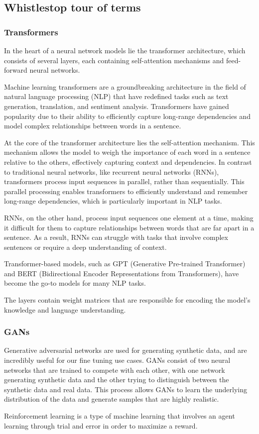 \subsection{Whistlestop tour of terms}
\subsubsection{Transformers}
In the heart of a neural network models lie the transformer architecture, which consists of several layers, each containing self-attention mechanisms and feed-forward neural networks. \par 
Machine learning transformers are a groundbreaking architecture in the field of natural language processing (NLP) that have redefined tasks such as text generation, translation, and sentiment analysis. Transformers have gained popularity due to their ability to efficiently capture long-range dependencies and model complex relationships between words in a sentence.\par 
At the core of the transformer architecture lies the self-attention mechanism. This mechanism allows the model to weigh the importance of each word in a sentence relative to the others, effectively capturing context and dependencies. In contrast to traditional neural networks, like recurrent neural networks (RNNs), transformers process input sequences in parallel, rather than sequentially. This parallel processing enables transformers to efficiently understand and remember long-range dependencies, which is particularly important in NLP tasks.\par
RNNs, on the other hand, process input sequences one element at a time, making it difficult for them to capture relationships between words that are far apart in a sentence. As a result, RNNs can struggle with tasks that involve complex sentences or require a deep understanding of context.\par
Transformer-based models, such as GPT (Generative Pre-trained Transformer) and BERT (Bidirectional Encoder Representations from Transformers), have become the go-to models for many NLP tasks.\par
The layers contain weight matrices that are responsible for encoding the model's knowledge and language understanding. \par 

\subsubsection{GANs}
Generative adversarial networks are used for generating synthetic data, and are incredibly useful for our fine tuning use cases. GANs consist of two neural networks that are trained to compete with each other, with one network generating synthetic data and the other trying to distinguish between the synthetic data and real data. This process allows GANs to learn the underlying distribution of the data and generate samples that are highly realistic.\par
Reinforcement learning is a type of machine learning that involves an agent learning through trial and error in order to maximize a reward. 
